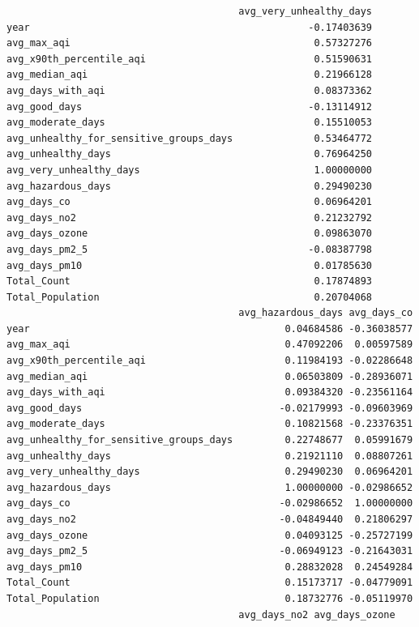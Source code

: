 \documentclass[
  12pt,
]{article}
\begin{document}
\begin{verbatim}
                                        avg_very_unhealthy_days
year                                                -0.17403639
avg_max_aqi                                          0.57327276
avg_x90th_percentile_aqi                             0.51590631
avg_median_aqi                                       0.21966128
avg_days_with_aqi                                    0.08373362
avg_good_days                                       -0.13114912
avg_moderate_days                                    0.15510053
avg_unhealthy_for_sensitive_groups_days              0.53464772
avg_unhealthy_days                                   0.76964250
avg_very_unhealthy_days                              1.00000000
avg_hazardous_days                                   0.29490230
avg_days_co                                          0.06964201
avg_days_no2                                         0.21232792
avg_days_ozone                                       0.09863070
avg_days_pm2_5                                      -0.08387798
avg_days_pm10                                        0.01785630
Total_Count                                          0.17874893
Total_Population                                     0.20704068
                                        avg_hazardous_days avg_days_co
year                                            0.04684586 -0.36038577
avg_max_aqi                                     0.47092206  0.00597589
avg_x90th_percentile_aqi                        0.11984193 -0.02286648
avg_median_aqi                                  0.06503809 -0.28936071
avg_days_with_aqi                               0.09384320 -0.23561164
avg_good_days                                  -0.02179993 -0.09603969
avg_moderate_days                               0.10821568 -0.23376351
avg_unhealthy_for_sensitive_groups_days         0.22748677  0.05991679
avg_unhealthy_days                              0.21921110  0.08807261
avg_very_unhealthy_days                         0.29490230  0.06964201
avg_hazardous_days                              1.00000000 -0.02986652
avg_days_co                                    -0.02986652  1.00000000
avg_days_no2                                   -0.04849440  0.21806297
avg_days_ozone                                  0.04093125 -0.25727199
avg_days_pm2_5                                 -0.06949123 -0.21643031
avg_days_pm10                                   0.28832028  0.24549284
Total_Count                                     0.15173717 -0.04779091
Total_Population                                0.18732776 -0.05119970
                                        avg_days_no2 avg_days_ozone

\end{verbatim}
\end{document}
